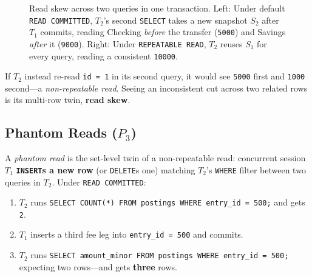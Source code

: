\begin{figure}[H]
\caption{Read skew across two queries in one transaction. Left: Under default \texttt{READ COMMITTED}, $T_2$'s second \texttt{SELECT} takes a new snapshot $S_2$ after $T_1$ commits, reading Checking \emph{before} the transfer (\texttt{5000}) and Savings \emph{after} it (\texttt{9000}). Right: Under \texttt{REPEATABLE READ}, $T_2$ reuses $S_1$ for every query, reading a consistent \texttt{10000}.}
\label{ch06:fig-read-skew}
\end{figure}

If $T_2$ instead re-read \texttt{id = 1} in its second query, it would see \texttt{5000} first and \texttt{1000} second---a \emph{non-repeatable read}. Seeing an inconsistent cut across two related rows is its multi-row twin, \textbf{read skew}.

\subsection{Phantom Reads ($P_3$)}

A \emph{phantom read} is the set-level twin of a non-repeatable read: concurrent session~$T_1$ \textbf{\texttt{INSERT}s a new row} (or \texttt{DELETE}s one) matching $T_2$'s \texttt{WHERE} filter between two queries in $T_2$. Under \texttt{READ COMMITTED}:
\begin{enumerate}
  \item $T_2$ runs \texttt{SELECT COUNT(*) FROM postings WHERE entry\_id = 500;} and gets \texttt{2}.
  \item $T_1$ inserts a third fee leg into \texttt{entry\_id = 500} and commits.
  \item $T_2$ runs \texttt{SELECT amount\_minor FROM postings WHERE entry\_id = 500;} expecting two rows---and gets \textbf{three} rows.
\end{enumerate}

